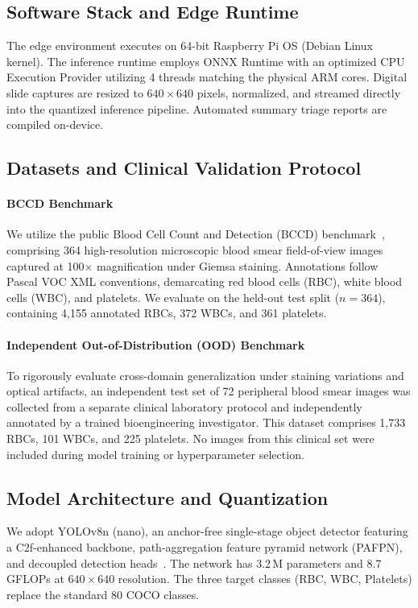 \documentclass[10pt,conference]{IEEEtran}
\begin{document}
\subsection{Software Stack and Edge Runtime}
The edge environment executes on 64-bit Raspberry Pi OS (Debian Linux kernel). The inference runtime employs ONNX Runtime with an optimized CPU Execution Provider utilizing 4 threads matching the physical ARM cores. Digital slide captures are resized to $640 \times 640$ pixels, normalized, and streamed directly into the quantized inference pipeline. Automated summary triage reports are compiled on-device.

\subsection{Datasets and Clinical Validation Protocol}
\paragraph{BCCD Benchmark} We utilize the public Blood Cell Count and Detection (BCCD) benchmark~\cite{bccd}, comprising 364 high-resolution microscopic blood smear field-of-view images captured at 100$\times$ magnification under Giemsa staining. Annotations follow Pascal VOC XML conventions, demarcating red blood cells (RBC), white blood cells (WBC), and platelets. We evaluate on the held-out test split ($n = 364$), containing 4,155 annotated RBCs, 372 WBCs, and 361 platelets.
\paragraph{Independent Out-of-Distribution (OOD) Benchmark} To rigorously evaluate cross-domain generalization under staining variations and optical artifacts, an independent test set of 72 peripheral blood smear images was collected from a separate clinical laboratory protocol and independently annotated by a trained bioengineering investigator. This dataset comprises 1,733 RBCs, 101 WBCs, and 225 platelets. No images from this clinical set were included during model training or hyperparameter selection.

\subsection{Model Architecture and Quantization}
We adopt YOLOv8n (nano), an anchor-free single-stage object detector featuring a C2f-enhanced backbone, path-aggregation feature pyramid network (PAFPN), and decoupled detection heads~\cite{yolov8}. The network has 3.2\,M parameters and 8.7\,GFLOPs at $640 \times 640$ resolution. The three target classes (RBC, WBC, Platelets) replace the standard 80 COCO classes.
\end{document}
